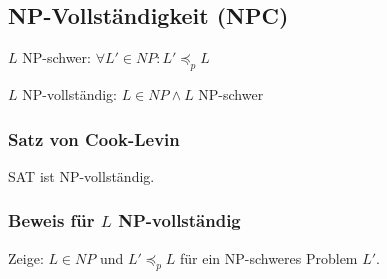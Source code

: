\subsection*{NP-Vollständigkeit (NPC)}
$L$ NP-schwer: $\forall L'\in NP: L' \preceq_p L$

$L$ NP-vollständig: $L \in NP \land L$ NP-schwer

\subsubsection*{Satz von Cook-Levin}
SAT ist NP-vollständig.

\subsubsection*{Beweis für $L$ NP-vollständig}
Zeige: $L \in NP$ und $L' \preceq_p L$ für ein NP-schweres Problem $L'$.
